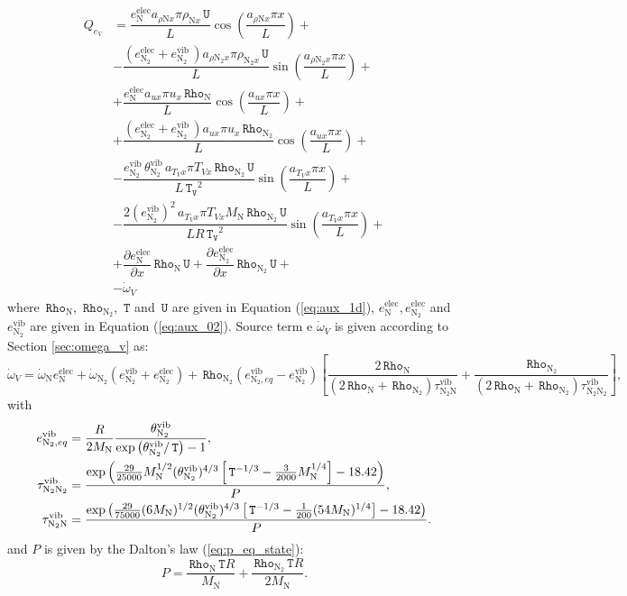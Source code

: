 \documentclass[10pt]{article}
\newcommand{\diff}[2] {\dfrac{\partial #1 }{\partial #2}}
\newcommand{\Rho}{\,\mathtt{Rho}}
\newcommand{\T}{\,\mathtt{T}}
\newcommand{\U}{\,\mathtt{U}}
\newcommand{\TV}{\,\mathtt{T_V}}
\newcommand{\N}{\text{N}}
\newcommand{\elec}{\text{elec}}
\newcommand{\vib}{\text{vib}}
\begin{document}
\begin{equation}
\begin{split}\label{eq:source_eV}
Q_{e_V} &= \dfrac{e_{\N}^{\elec} a_{  \rho \N x } \pi \rho_{\N x} \U }{L} \cos\left(\dfrac{a_{  \rho \N x } \pi x}{L}\right) +\\ 
&- \dfrac{(e_{\N_2}^{\elec}+e_{\N_2}^{\vib} \, ) a_{  \rho \N_2 x } \pi \rho_{\N_2 x} \U }{L} \sin\left(\dfrac{a_{  \rho \N_2 x } \pi x}{L}\right)  +\\ 
&+ \dfrac{e_{\N}^{\elec} a_{ux} \pi u_x \Rho_{\N} }{L} \cos\left(\dfrac{a_{ux} \pi x}{L}\right)+\\ 
&+ \dfrac{(e_{\N_2}^{\elec}+e_{\N_2}^{\vib} \, ) a_{ux} \pi u_x \Rho_{\N_2} }{L}\cos\left(\dfrac{a_{ux} \pi x}{L}\right)  +\\ 
&-\dfrac{e_{\N_2}^{\vib} \, \theta^{\vib}_{\N_2} \, a_{T_V x} \pi T_{Vx}   \Rho_{\N_2} \U}{L \TV^2} \sin\left(\dfrac{a_{T_V x} \pi x}{L}\right) +\\
&-\dfrac{2 (e_{\N_2}^{\vib})^2 \, a_{T_V x} \pi T_{Vx} M_\N \Rho_{\N_2} \U }{L R \TV^2}\sin\left(\dfrac{a_{T_V x} \pi x}{L}\right) +\\
&+\diff{e_{\N}^{\elec}}{x} \Rho_{\N} \U+\diff{e_{\N_2}^{\elec}}{x} \Rho_{\N_2} \U +\\
&- \dot{\omega}_V
\end{split}
\end{equation}
%
where   $\Rho_{\text{N}},\,\Rho_{\text{N}_2},\, \T$ and $\U$ are given  in Equation (\ref{eq:aux_1d}),   $e_{\N}^{\elec}, e_{\N_2}^{\elec}$ and $e_{\N_2}^{\vib}  $ are given in Equation (\ref{eq:aux_02}). Source term e $\dot{\omega}_V$ is given according to Section \ref{sec:omega_v} as:
$$\dot{\omega}_V = \dot{\omega}_\N e_{\N}^{\elec} + \dot{\omega}_{\N_2} (e_{\N_2}^{\vib}+e_{\N_2}^{\elec})+\Rho_{\N_2} (e_{\N_2,eq}^{\vib}-e_{\N_2}^{\vib}) \left[\dfrac{2 \Rho_{\N}}{(2 \Rho_{\N}+\Rho_{\N_2}) \tau^{\vib}_{\N_2\N}}+\dfrac{\Rho_{\N_2}}{(2 \Rho_{\N}+\Rho_{\N_2}) \tau^{\vib}_{\N_2\N_2}}\right],$$
with
\begin{equation}
\begin{split}
e_{\N_2, eq}^{\vib} &= \dfrac{R}{2 M_\N} \frac{\theta^{\vib}_{\N_2}}{\exp\left(\theta^{\vib}_{\N_2}/ \T \right) - 1} , \vspace{5pt}\\
\tau^{\vib}_{\N_2\N_2} &= \dfrac{ \exp\left(\frac{29}{25000} M_\N^{1/2} (\theta^{\vib}_{\N_2})^{4/3}  \left[\T^{-1/3}-\frac{3}{2000} M_\N^{1/4}\right] -18.42\right)}{P}, \vspace{5pt}\\
\tau^{\vib}_{\N_2\N} &=\dfrac{ \exp\left(\frac{29}{75000} (6 M_\N)^{1/2} (\theta^{\vib}_{\N_2})^{4/3} \left[\T^{-1/3} -\frac{1}{200} (54M_\N)^{1/4}\right]-18.42\right)}{P}.
\end{split}
\end{equation}
and $P$ is given by the Dalton's law (\ref{eq:p_eq_state}):
$$P = \dfrac{\Rho_{\N}  \T R}{M_\N}+ \dfrac{\Rho_{\N_2}  \T R}{2 M_\N}.$$
\end{document}
